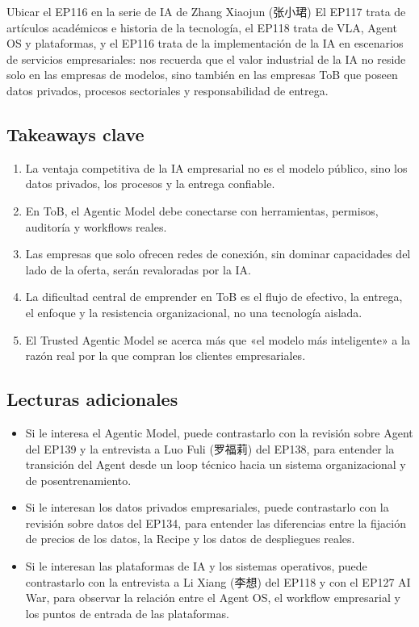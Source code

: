 \documentclass[a4paper]{article}
\begin{document}
\begin{importantbox}{Ubicar el EP116 en la serie de IA de Zhang Xiaojun (张小珺)}
El EP117 trata de artículos académicos e historia de la tecnología, el EP118 trata de VLA, Agent OS y plataformas, y el EP116 trata de la implementación de la IA en escenarios de servicios empresariales: nos recuerda que el valor industrial de la IA no reside solo en las empresas de modelos, sino también en las empresas ToB que poseen datos privados, procesos sectoriales y responsabilidad de entrega.
\end{importantbox}

\subsection{Takeaways clave}

\begin{enumerate}
\item La ventaja competitiva de la IA empresarial no es el modelo público, sino los datos privados, los procesos y la entrega confiable.
\item En ToB, el Agentic Model debe conectarse con herramientas, permisos, auditoría y workflows reales.
\item Las empresas que solo ofrecen redes de conexión, sin dominar capacidades del lado de la oferta, serán revaloradas por la IA.
\item La dificultad central de emprender en ToB es el flujo de efectivo, la entrega, el enfoque y la resistencia organizacional, no una tecnología aislada.
\item El Trusted Agentic Model se acerca más que «el modelo más inteligente» a la razón real por la que compran los clientes empresariales.
\end{enumerate}

\subsection{Lecturas adicionales}

\begin{itemize}
\item Si le interesa el Agentic Model, puede contrastarlo con la revisión sobre Agent del EP139 y la entrevista a Luo Fuli (罗福莉) del EP138, para entender la transición del Agent desde un loop técnico hacia un sistema organizacional y de posentrenamiento.
\item Si le interesan los datos privados empresariales, puede contrastarlo con la revisión sobre datos del EP134, para entender las diferencias entre la fijación de precios de los datos, la Recipe y los datos de despliegues reales.
\item Si le interesan las plataformas de IA y los sistemas operativos, puede contrastarlo con la entrevista a Li Xiang (李想) del EP118 y con el EP127 AI War, para observar la relación entre el Agent OS, el workflow empresarial y los puntos de entrada de las plataformas.
\end{itemize}
\end{document}
